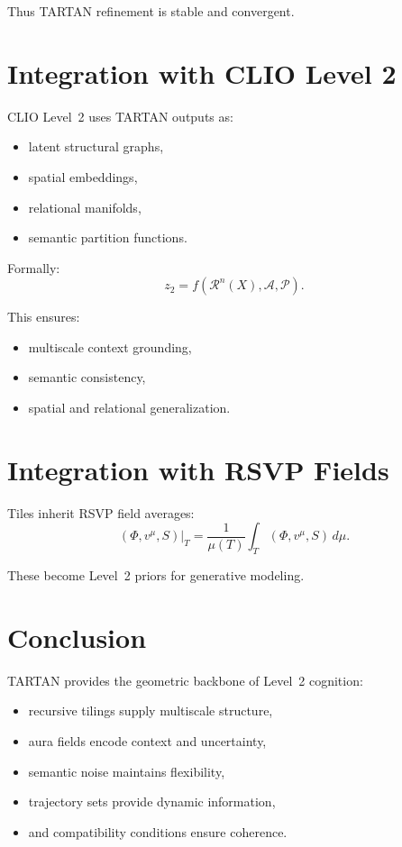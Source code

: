 \documentclass[12pt,oneside]{book}
\theoremstyle{plain}
\theoremstyle{definition}
\begin{document}
Thus TARTAN refinement is stable and convergent.

\section{Integration with CLIO Level 2}

CLIO Level~2 uses TARTAN outputs as:

\begin{itemize}
    \item latent structural graphs,
    \item spatial embeddings,
    \item relational manifolds,
    \item semantic partition functions.
\end{itemize}

Formally:
\[
z_2 = f(\mathcal{R}^n(X), \mathcal{A}, \mathcal{P}).
\]

This ensures:

\begin{itemize}
    \item multiscale context grounding,
    \item semantic consistency,
    \item spatial and relational generalization.
\end{itemize}

\section{Integration with RSVP Fields}

Tiles inherit RSVP field averages:
\[
(\Phi, v^\mu, S)|_T
=
\frac{1}{\mu(T)} \int_T (\Phi, v^\mu, S)\, d\mu.
\]

These become Level~2 priors for generative modeling.

\section{Conclusion}

TARTAN provides the geometric backbone of Level~2 cognition:

\begin{itemize}
    \item recursive tilings supply multiscale structure,
    \item aura fields encode context and uncertainty,
    \item semantic noise maintains flexibility,
    \item trajectory sets provide dynamic information,
    \item and compatibility conditions ensure coherence.
\end{itemize}
\end{document}
